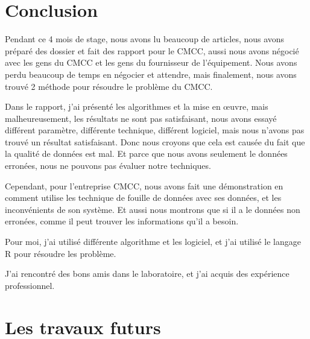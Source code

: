 \section*{Conclusion}

Pendant ce 4 mois de stage, nous avons lu beaucoup de articles, nous avons préparé des dossier et fait des rapport pour le CMCC, aussi nous avons négocié avec les gens du CMCC et les gens du fournisseur de l'équipement. Nous avons perdu beaucoup de temps en négocier et attendre, mais finalement, nous avons trouvé 2 méthode pour résoudre le problème du CMCC.

Dans le rapport, j'ai présenté les algorithmes et la mise en \oe uvre, mais malheureusement, les résultats ne sont pas satisfaisant, nous avons essayé différent paramètre, différente technique, différent logiciel, mais nous n'avons pas trouvé un résultat satisfaisant. Donc nous croyons que cela est causée du fait que la qualité de données est mal. Et parce que nous avons seulement le données erronées, nous ne pouvons pas évaluer notre techniques.

Cependant, pour l'entreprise CMCC, nous avons fait une démonstration en comment utilise les technique de fouille de données avec ses données, et les inconvénients de son système. Et aussi nous montrons que si il a le données non erronées, comme il peut trouver les informations qu'il a besoin.

Pour moi, j'ai utilisé différente algorithme et les logiciel, et j'ai utilisé le langage R pour résoudre les problème. 

J'ai rencontré des bons amis dans le laboratoire, et j'ai acquis des expérience professionnel.

\newpage
\section*{Les travaux futurs}




